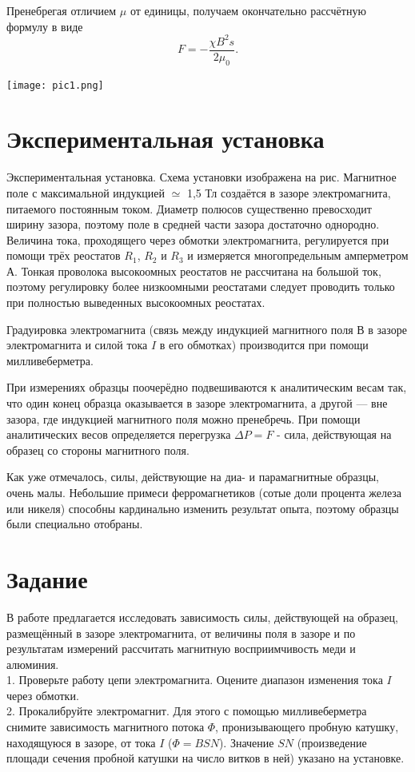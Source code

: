 Пренебрегая отличием $\mu$ от единицы, получаем окончательно рассчётную формулу в виде
\begin{equation}\label{4}
    F = -\frac{\chi B^2s }{2 \mu_0}.
\end{equation}

\begin{center}
    \texttt{[image: pic1.png]} 
\end{center}



\section{\label{sec:level1}Экспериментальная установка}
Экспериментальная установка. Схема установки изображена на рис. Магнитное поле с максимальной индукцией $\simeq$ 1,5 Тл создаётся в зазоре электромагнита, питаемого постоянным током. Диаметр полюсов существенно превосходит ширину зазора, поэтому поле в средней части зазора достаточно однородно. Величина тока, проходящего через обмотки электромагнита, регулируется при помощи трёх реостатов $R_1$, $R_2$ и $R_3$ и измеряется многопредельным амперметром А. Тонкая проволока высокоомных реостатов не рассчитана на большой ток, поэтому регулировку более низкоомными реостатами следует проводить только при полностью выведенных высокоомных реостатах.

Градуировка электромагнита (связь между индукцией магнитного поля $В$ в зазоре электромагнита и силой тока $I$ в его обмотках) производится при помощи милливеберметра.

При измерениях образцы поочерёдно подвешиваются к аналитическим весам так, что один конец образца оказывается в зазоре электромагнита, а другой — вне зазора, где индукцией магнитного поля можно пренебречь. При помощи аналитических весов определяется перегрузка $\Delta{P} = F$ - сила, действующая на образец со стороны магнитного поля.

Как уже отмечалось, силы, действующие на диа- и парамагнитные образцы, очень малы. Небольшие примеси ферромагнетиков (сотые доли процента железа или никеля) способны кардинально изменить результат опыта, поэтому образцы были специально отобраны.

\section{\label{sec:level1}Задание}

В работе предлагается исследовать зависимость силы, действующей на образец, размещённый в зазоре электромагнита, от величины поля в зазоре и по результатам измерений рассчитать магнитную восприимчивость меди и алюминия.\\
1. Проверьте работу цепи электромагнита. Оцените диапазон изменения тока $I$ через обмотки.\\
2. Прокалибруйте электромагнит. Для этого с помощью милливеберметра снимите зависимость магнитного потока $\Phi$, пронизывающего пробную катушку, находящуюся в зазоре, от тока $I$ ($\Phi = BSN$). Значение $SN$ (произведение площади сечения пробной катушки на число витков в ней) указано на установке.

